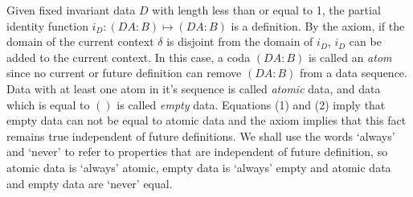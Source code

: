 \documentclass[11pt]{article}
\begin{document}
     Given fixed invariant data $D$ with length less than or equal to 1, the partial identity function 
$i_D:(D A:B)\mapsto (D A:B)$ is a definition.  By the axiom, if the domain of the current context $\delta$ is disjoint 
from the domain of $i_D$, $i_D$ can be added to the current context.  In this case, a coda $(D A:B)$ is called an {\it atom} 
since no current or future definition can remove $(D A:B)$ from a data sequence.  
Data with at least one atom in it's sequence is called {\it atomic} data, and data which is equal to $()$ is called {\it empty} data.
Equations (1) and (2) imply that empty data can not be equal to atomic data and the axiom implies that this fact remains
true independent of future definitions.  We shall use the words `always' and `never' to refer to properties that are independent of
future definition, so atomic data is `always' atomic, empty data is `always' empty and atomic data and empty data are `never' equal.
\end{document}
